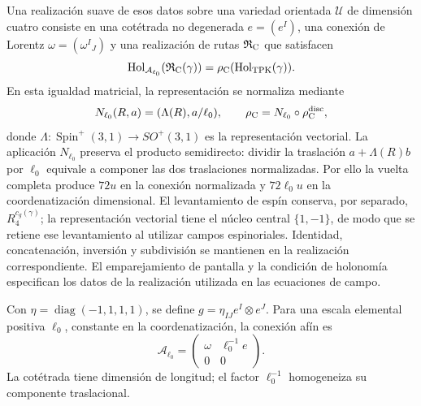 Una realización suave de esos datos sobre una variedad orientada
\(\mathcal U\) de dimensión cuatro consiste en una cotétrada
no degenerada \(e=(e^I)\), una conexión de Lorentz
\(\omega=(\omega^I{}_J)\) y una realización de rutas
\(\mathfrak R_{\rm C}\) que satisfacen
\begin{equation}
 \operatorname{Hol}_{\mathcal A_{\ell_0}}
       (\mathfrak R_{\rm C}(\gamma))
 =\rho_{\rm C}(\operatorname{Hol}_{\rm TPK}(\gamma)).
 \label{vii:eq:compatibilidad-holonomia-geometrica}
\end{equation}
En esta igualdad matricial, la representación se normaliza mediante
\[
 N_{\ell_0}(R,a)=(\Lambda(R),a/\ell_0),\qquad
 \rho_{\rm C}=N_{\ell_0}\circ\rho_{\rm C}^{\rm disc},
\]
donde \(\Lambda:\operatorname{Spin}^+(3,1)\to SO^+(3,1)\)
es la representación vectorial. La aplicación \(N_{\ell_0}\)
preserva el producto semidirecto: dividir la traslación
\(a+\Lambda(R)b\) por \(\ell_0\) equivale a componer las
dos traslaciones normalizadas. Por ello la vuelta completa produce
\(72u\) en la conexión normalizada y \(72\ell_0u\) en la
coordenatización dimensional. El levantamiento de espín conserva, por separado,
\(R_4^{c_g(\gamma)}\); la representación vectorial tiene el
núcleo central \(\{1,-1\}\), de modo que se retiene ese
levantamiento al utilizar campos espinoriales.
Identidad, concatenación, inversión y subdivisión se mantienen en la
realización correspondiente. El emparejamiento de
pantalla y la condición de holonomía especifican los datos de la
realización utilizada en las ecuaciones de campo.

Con \(\eta=\operatorname{diag}(-1,1,1,1)\), se define
\(g=\eta_{IJ}e^I\otimes e^J\). Para una escala elemental
positiva \(\ell_0\), constante en la coordenatización, la conexión afín es
\begin{equation}
 \mathcal A_{\ell_0}
 =\begin{pmatrix}\omega&\ell_0^{-1}e\\0&0\end{pmatrix}.
 \label{vii:eq:conexion-afin-realizada}
\end{equation}
La cotétrada tiene dimensión de longitud; el factor
\(\ell_0^{-1}\) homogeneiza su componente traslacional.

